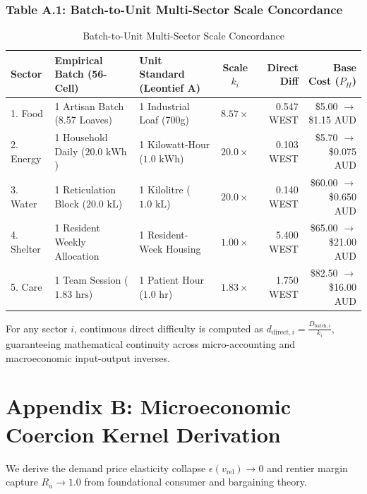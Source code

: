 \documentclass[preprint,12pt,authoryear]{elsarticle}
\theoremstyle{definition}
\begin{document}
\subsubsection*{Table A.1: Batch-to-Unit Multi-Sector Scale Concordance}

\begin{table}[htbp]
\centering
\small
\caption{Batch-to-Unit Multi-Sector Scale Concordance}
\label{tab:scale_concordance}
\begin{tabularx}{\textwidth}{l p{4.2cm} p{4.2cm} c r r}
\toprule
\textbf{Sector} & \textbf{Empirical Batch (56-Cell)} & \textbf{Unit Standard (Leontief $\mathbf{A}$)} & \textbf{Scale $k_i$} & \textbf{Direct Diff} & \textbf{Base Cost ($P_H$)} \\
\midrule
1. Food & 1 Artisan Batch (8.57 Loaves) & 1 Industrial Loaf (700g) & $8.57\times$ & 0.547 WEST & \$5.00 $\to$ \$1.15 AUD \\
2. Energy & 1 Household Daily ($20.0\text{ kWh}$) & 1 Kilowatt-Hour ($1.0\text{ kWh}$) & $20.0\times$ & 0.103 WEST & \$5.70 $\to$ \$0.075 AUD \\
3. Water & 1 Reticulation Block ($20.0\text{ kL}$) & 1 Kilolitre ($1.0\text{ kL}$) & $20.0\times$ & 0.140 WEST & \$60.00 $\to$ \$0.650 AUD \\
4. Shelter & 1 Resident Weekly Allocation & 1 Resident-Week Housing & $1.00\times$ & 5.400 WEST & \$65.00 $\to$ \$21.00 AUD \\
5. Care & 1 Team Session ($1.83\text{ hrs}$) & 1 Patient Hour ($1.0\text{ hr}$) & $1.83\times$ & 1.750 WEST & \$82.50 $\to$ \$16.00 AUD \\
\bottomrule
\end{tabularx}
\end{table}

For any sector $i$, continuous direct difficulty is computed as $d_{\text{direct}, i} = \frac{D_{\text{batch}, i}}{k_i}$, guaranteeing mathematical continuity across micro-accounting and macroeconomic input-output inverses.



\section*{Appendix B: Microeconomic Coercion Kernel Derivation}

We derive the demand price elasticity collapse $\epsilon(v_{\text{rel}}) \to 0$ and rentier margin capture $R_a \to 1.0$ from foundational consumer and bargaining theory.
\end{document}
